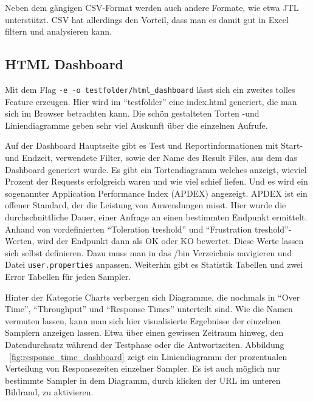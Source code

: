 \documentclass[a4paper,12pt]{article}
\newcommand{\codeInLine}[1]{%
\colorbox{graybackgroundColor}{\lstinline{#1}} %
}
\begin{document}
Neben dem gängigen CSV-Format werden auch andere Formate, wie etwa JTL unterstützt. CSV hat allerdings den Vorteil, dass man es damit gut in Excel filtern und analysieren kann.

\subsection{HTML Dashboard}
\label{chap:html_dashboard}
Mit dem Flag \codeInLine{-e -o testfolder/html_dashboard} lässt sich ein zweites tolles Feature erzeugen. Hier wird im "`testfolder"' eine index.html generiert, die man sich im Browser betrachten kann.
Die schön gestalteten Torten -und Liniendiagramme geben sehr viel Auskunft über die einzelnen Aufrufe.

Auf der Dashboard Hauptseite gibt es Test und Reportinformationen mit Start- und Endzeit, verwendete Filter, sowie der Name des Result Files, aus dem das Dashboard generiert wurde. Es gibt ein Tortendiagramm welches anzeigt, wieviel Prozent der Requests erfolgreich waren und wie viel schief liefen. 
Und es wird ein sogenannter Application Performance Index (APDEX) angezeigt. APDEX ist ein offener Standard, der die Leistung von Anwendungen misst. Hier wurde die durchschnittliche Dauer, einer Anfrage an einen bestimmten Endpunkt ermittelt. Anhand von vordefinierten "`Toleration treshold"' und "`Frustration treshold"'-Werten, wird der Endpunkt dann als OK oder KO bewertet. Diese Werte lassen sich selbst definieren. Dazu muss man in das /bin Verzeichnis navigieren und Datei \codeInLine{user.properties} anpassen. Weiterhin gibt es Statistik Tabellen und zwei Error Tabellen für jeden Sampler.

Hinter der Kategorie Charts verbergen sich Diagramme, die nochmals in "`Over Time"', "`Throughput"' und "`Response Times"' unterteilt sind. Wie die Namen vermuten lassen, kann man sich hier visualisierte Ergebnisse der einzelnen Samplern anzeigen lassen. Etwa über einen gewissen Zeitraum hinweg, den Datendurchsatz während der Testphase oder die Antwortzeiten. Abbildung ~\ref{fig:response_time_dashboard} zeigt ein Liniendiagramm der prozentualen Verteilung von Responsezeiten einzelner Sampler. Es ist auch möglich nur bestimmte Sampler in dem Diagramm, durch klicken der URL im unteren Bildrand, zu aktivieren.
\end{document}
